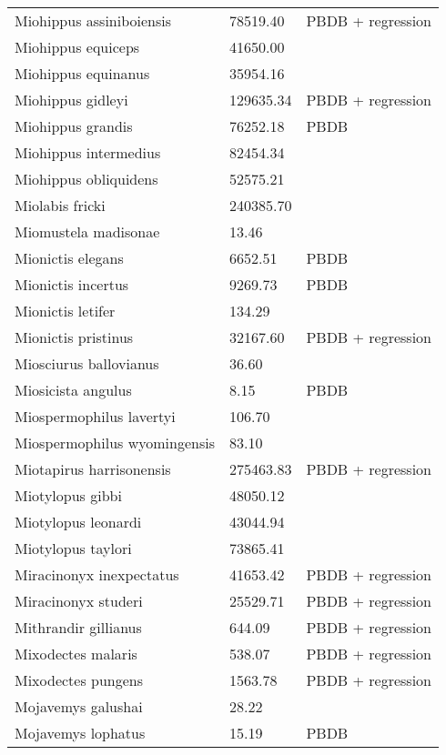 \begin{center}
\begin{longtable}{p{} p{} p{} }
  Miohippus assiniboiensis & 78519.40 & PBDB + regression \\ 
  Miohippus equiceps & 41650.00 & \cite{McKenna2011} \\ 
  Miohippus equinanus & 35954.16 & \cite{Tomiya2013} \\ 
  Miohippus gidleyi & 129635.34 & PBDB + regression \\ 
  Miohippus grandis & 76252.18 & PBDB \\ 
  Miohippus intermedius & 82454.34 & \cite{Tomiya2013} \\ 
  Miohippus obliquidens & 52575.21 & \cite{Tomiya2013} \\ 
  Miolabis fricki & 240385.70 & \cite{Tomiya2013} \\ 
  Miomustela madisonae & 13.46 & \cite{Tomiya2013} \\ 
  Mionictis elegans & 6652.51 & PBDB \\ 
  Mionictis incertus & 9269.73 & PBDB \\ 
  Mionictis letifer & 134.29 & \cite{Tomiya2013} \\ 
  Mionictis pristinus & 32167.60 & PBDB + regression \\ 
  Miosciurus ballovianus & 36.60 & \cite{Tomiya2013} \\ 
  Miosicista angulus & 8.15 & PBDB \\ 
  Miospermophilus lavertyi & 106.70 & \cite{Tomiya2013} \\ 
  Miospermophilus wyomingensis & 83.10 & \cite{Tomiya2013} \\ 
  Miotapirus harrisonensis & 275463.83 & PBDB + regression \\ 
  Miotylopus gibbi & 48050.12 & \cite{Tomiya2013} \\ 
  Miotylopus leonardi & 43044.94 & \cite{Tomiya2013} \\ 
  Miotylopus taylori & 73865.41 & \cite{Tomiya2013} \\ 
  Miracinonyx inexpectatus & 41653.42 & PBDB + regression \\ 
  Miracinonyx studeri & 25529.71 & PBDB + regression \\ 
  Mithrandir gillianus & 644.09 & PBDB + regression \\ 
  Mixodectes malaris & 538.07 & PBDB + regression \\ 
  Mixodectes pungens & 1563.78 & PBDB + regression \\ 
  Mojavemys galushai & 28.22 & \cite{Tomiya2013} \\ 
  Mojavemys lophatus & 15.19 & PBDB \\ 

\end{longtable}
\end{center}
